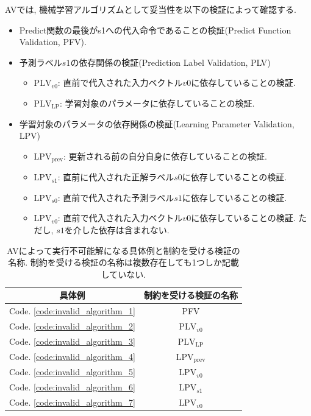 \documentclass[11pt,oneside,openany,report]{jsbook}
\begin{document}
AVでは, 機械学習アルゴリズムとして妥当性を以下の検証によって確認する.
\begin{itemize}
  \item Predict関数の最後がs1への代入命令であることの検証(Predict Function Validation, PFV).
  \item 予測ラベル$s1$の依存関係の検証(Prediction Label Validation, PLV)
        \begin{itemize}
          \item $\mathrm{PLV}_{v0}$: 直前で代入された入力ベクトル$v0$に依存していることの検証.
          \item $\mathrm{PLV}_\mathrm{LP}$: 学習対象のパラメータに依存していることの検証.
        \end{itemize}
  \item 学習対象のパラメータの依存関係の検証(Learning Parameter Validation, LPV)
        \begin{itemize}
          \item $\mathrm{LPV}_\mathrm{prev}$: 更新される前の自分自身に依存していることの検証.
          \item $\mathrm{LPV}_{s1}$: 直前に代入された正解ラベル$s0$に依存していることの検証.
          \item $\mathrm{LPV}_{s0}$: 直前で代入された予測ラベル$s1$に依存していることの検証.
          \item $\mathrm{LPV}_{v0}$: 直前で代入された入力ベクトル$v0$に依存していることの検証. ただし, $s1$を介した依存は含まれない.
        \end{itemize}
\end{itemize}

\begin{table}[tbp]
  \caption{AVによって実行不可能解になる具体例と制約を受ける検証の名称. 制約を受ける検証の名称は複数存在しても1つしか記載していない. }
  \label{table:invalid_algorithms_av}
  \centering
  \begin{tabular}{c|c}
    \hline
    具体例                                  & 制約を受ける検証の名称                  \\
    \hline \hline
    Code. \ref{code:invalid_algorithm_1} & PFV                          \\
    Code. \ref{code:invalid_algorithm_2} & $\mathrm{PLV}_{v0}$          \\
    Code. \ref{code:invalid_algorithm_3} & $\mathrm{PLV}_\mathrm{LP}$   \\
    Code. \ref{code:invalid_algorithm_4} & $\mathrm{LPV}_\mathrm{prev}$ \\
    Code. \ref{code:invalid_algorithm_5} & $\mathrm{LPV}_{v0}$          \\
    Code. \ref{code:invalid_algorithm_6} & $\mathrm{LPV}_{s1}$          \\
    Code. \ref{code:invalid_algorithm_7} & $\mathrm{LPV}_{v0}$          \\
    \hline
  \end{tabular}
\end{table}
\end{document}
